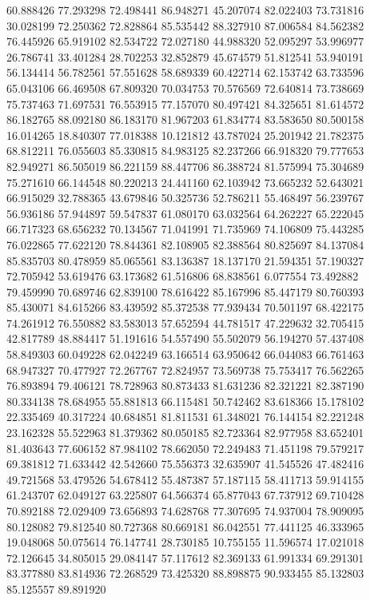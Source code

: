 60.888426
77.293298
72.498441
86.948271
45.207074
82.022403
73.731816
30.028199
72.250362
72.828864
85.535442
88.327910
87.006584
84.562382
76.445926
65.919102
82.534722
72.027180
44.988320
52.095297
53.996977
26.786741
33.401284
28.702253
32.852879
45.674579
51.812541
53.940191
56.134414
56.782561
57.551628
58.689339
60.422714
62.153742
63.733596
65.043106
66.469508
67.809320
70.034753
70.576569
72.640814
73.738669
75.737463
71.697531
76.553915
77.157070
80.497421
84.325651
81.614572
86.182765
88.092180
86.183170
81.967203
61.834774
83.583650
80.500158
16.014265
18.840307
77.018388
10.121812
43.787024
25.201942
21.782375
68.812211
76.055603
85.330815
84.983125
82.237266
66.918320
79.777653
82.949271
86.505019
86.221159
88.447706
86.388724
81.575994
75.304689
75.271610
66.144548
80.220213
24.441160
62.103942
73.665232
52.643021
66.915029
32.788365
43.679846
50.325736
52.786211
55.468497
56.239767
56.936186
57.944897
59.547837
61.080170
63.032564
64.262227
65.222045
66.717323
68.656232
70.134567
71.041991
71.735969
74.106809
75.443285
76.022865
77.622120
78.844361
82.108905
82.388564
80.825697
84.137084
85.835703
80.478959
85.065561
83.136387
18.137170
21.594351
57.190327
72.705942
53.619476
63.173682
61.516806
68.838561
6.077554
73.492882
79.459990
70.689746
62.839100
78.616422
85.167996
85.447179
80.760393
85.430071
84.615266
83.439592
85.372538
77.939434
70.501197
68.422175
74.261912
76.550882
83.583013
57.652594
44.781517
47.229632
32.705415
42.817789
48.884417
51.191616
54.557490
55.502079
56.194270
57.437408
58.849303
60.049228
62.042249
63.166514
63.950642
66.044083
66.761463
68.947327
70.477927
72.267767
72.824957
73.569738
75.753417
76.562265
76.893894
79.406121
78.728963
80.873433
81.631236
82.321221
82.387190
80.334138
78.684955
55.881813
66.115481
50.742462
83.618366
15.178102
22.335469
40.317224
40.684851
81.811531
61.348021
76.144154
82.221248
23.162328
55.522963
81.379362
80.050185
82.723364
82.977958
83.652401
81.403643
77.606152
87.984102
78.662050
72.249483
71.451198
79.579217
69.381812
71.633442
42.542660
75.556373
32.635907
41.545526
47.482416
49.721568
53.479526
54.678412
55.487387
57.187115
58.411713
59.914155
61.243707
62.049127
63.225807
64.566374
65.877043
67.737912
69.710428
70.892188
72.029409
73.656893
74.628768
77.307695
74.937004
78.909095
80.128082
79.812540
80.727368
80.669181
86.042551
77.441125
46.333965
19.048068
50.075614
76.147741
28.730185
10.755155
11.596574
17.021018
72.126645
34.805015
29.084147
57.117612
82.369133
61.991334
69.291301
83.377880
83.814936
72.268529
73.425320
88.898875
90.933455
85.132803
85.125557
89.891920
